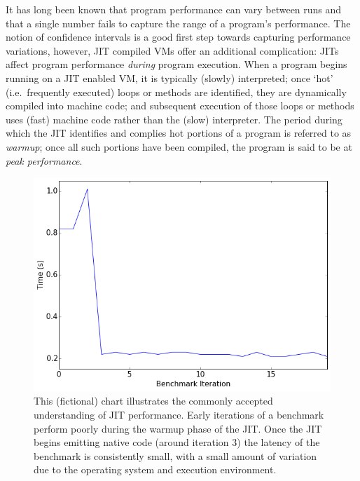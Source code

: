 \documentclass[10pt,preprint]{sigplanconf}
\begin{document}
It has long been known that program performance can vary between runs and that
a single number fails to capture the range of a program's performance. The
notion of confidence intervals is a good first step towards capturing
performance variations, however,
JIT compiled VMs offer an additional complication: JITs affect program
performance \emph{during} program execution. When a program begins running on a
JIT enabled VM, it is typically (slowly)
interpreted; once `hot' (i.e.~frequently executed) loops or methods are
identified, they are dynamically compiled into machine code; and subsequent
execution of those loops or methods uses (fast) machine code rather than the
(slow) interpreter. The period during which the JIT identifies and complies hot
portions of a program is referred to as \emph{warmup}; once all
such portions have been compiled, the program is said to be at \emph{peak
performance}.

\begin{figure}[h!]
\centering
\includegraphics[width=.4\textwidth]{img/trad}
\caption{ This (fictional) chart illustrates the commonly accepted understanding
of JIT performance. Early iterations of a benchmark perform poorly during the
warmup phase of the JIT. Once the JIT begins emitting native code (around
iteration 3) the latency of the benchmark is consistently small, with a small
amount of variation due to the operating system and execution environment.}
\label{fig:trad}
\end{figure}
\end{document}
